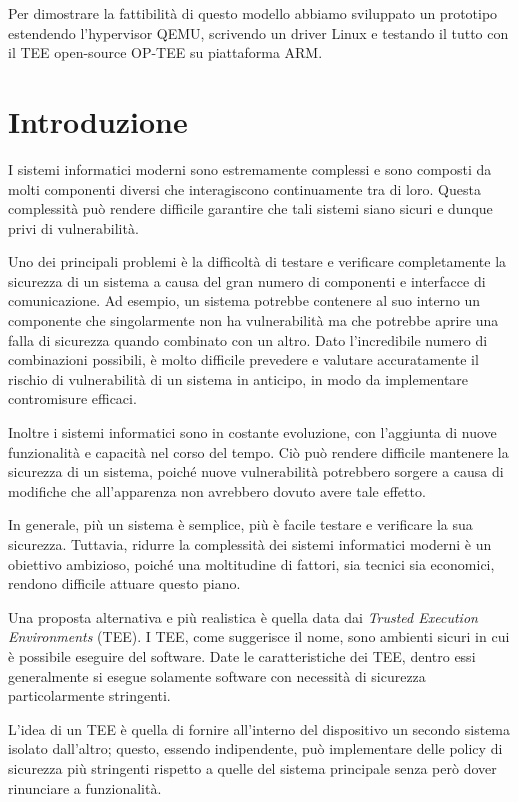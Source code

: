 \documentclass[12pt,italian]{report}
\begin{document}
Per dimostrare la fattibilità di questo modello abbiamo sviluppato un
prototipo estendendo l'hypervisor QEMU, scrivendo un driver Linux e
testando il tutto con il TEE open-source OP-TEE su piattaforma ARM.

\chapter{Introduzione}
\label{sec:introduzione}
I sistemi informatici moderni sono estremamente complessi e sono composti da
molti componenti diversi che interagiscono continuamente tra di loro.
Questa complessità può rendere difficile garantire che tali sistemi siano
sicuri e dunque privi di vulnerabilità.

Uno dei principali problemi è la difficoltà di testare e verificare
completamente la sicurezza di un sistema a causa del gran numero di
componenti e interfacce di comunicazione.
Ad esempio, un sistema potrebbe contenere al suo interno un componente che
singolarmente non ha vulnerabilità ma che potrebbe aprire una falla di
sicurezza quando combinato con un altro.
Dato l'incredibile numero di combinazioni possibili, è molto difficile
prevedere e valutare accuratamente il rischio di vulnerabilità di un sistema
in anticipo, in modo da implementare contromisure efficaci.

Inoltre i sistemi informatici sono in costante evoluzione, con
l'aggiunta di nuove funzionalità e capacità nel corso del tempo.
Ciò può rendere difficile mantenere la sicurezza di un sistema, poiché nuove
vulnerabilità potrebbero sorgere a causa di modifiche che all'apparenza non
avrebbero dovuto avere tale effetto.

In generale, più un sistema è semplice, più è facile testare e verificare
la sua sicurezza. 
Tuttavia, ridurre la complessità dei sistemi informatici moderni è un
obiettivo ambizioso, poiché una moltitudine di fattori, sia tecnici
sia economici, rendono difficile attuare questo piano.

Una proposta alternativa e più realistica è quella data dai
\textit{Trusted Execution Environments} (TEE).
I TEE, come suggerisce il nome, sono ambienti sicuri in cui è possibile
eseguire del software. Date le caratteristiche dei TEE, dentro essi
generalmente si esegue solamente software con necessità di sicurezza
particolarmente stringenti.

L'idea di un TEE è quella di fornire all'interno del dispositivo
un secondo sistema isolato dall'altro; questo, essendo
indipendente, può implementare delle policy di sicurezza più
stringenti rispetto a quelle del sistema principale senza però dover
rinunciare a funzionalità.
\end{document}
